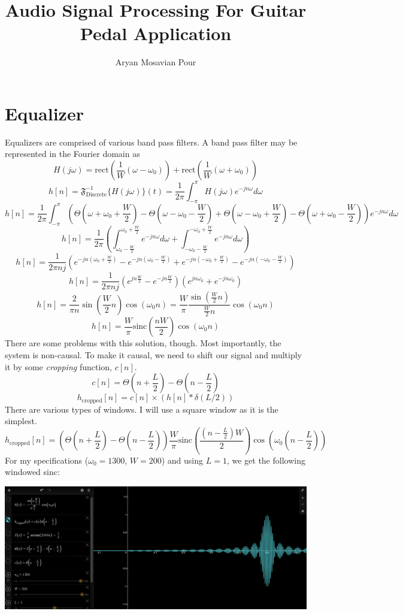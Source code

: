 \documentclass[a4paper]{article}
\title{Audio Signal Processing For Guitar Pedal Application}
\author{Aryan Mosavian Pour}
\begin{document}
\maketitle
\section{Equalizer}
Equalizers are comprised of various band pass filters. A band pass filter may be represented in the Fourier domain as
$$H(j\omega) = \text{rect}(\frac{1}{W}(\omega - \omega_0)) + \text{rect}(\frac{1}{W}(\omega + \omega_0))$$
$$h[n] = \mathfrak{F}^{-1}_\text{Discrete}\{H(j\omega)\}(t) = \frac{1}{2\pi}\int_{-\pi}^\pi H(j\omega) e^{-jn\omega}d\omega$$
$$h[n] = \frac{1}{2\pi}\int_{-\pi}^\pi (\Theta(\omega + \omega_0 + \frac{W}{2})-\Theta(\omega - \omega_0 - \frac{W}{2}) + \Theta(\omega - \omega_0 + \frac{W}{2})-\Theta(\omega + \omega_0 - \frac{W}{2}))e^{-jn\omega}d\omega$$
$$h[n] = \frac{1}{2\pi}(\int_{\omega_0 - \frac{W}{2}}^{\omega_0 + \frac{W}{2}} e^{-jn\omega}d\omega + \int_{-\omega_0 - \frac{W}{2}}^{-\omega_0 + \frac{W}{2}} e^{-jn\omega}d\omega)$$
$$h[n] = \frac{1}{2\pi nj}(e^{-jn(\omega_0 + \frac{W}{2})} - e^{-jn(\omega_0 - \frac{W}{2})} + e^{-jn(-\omega_0 + \frac{W}{2})} - e^{-jn(-\omega_0 - \frac{W}{2})})$$
$$h[n] = \frac{1}{2\pi nj}(e^{jn\frac{W}{2}} - e^{-jn\frac{W}{2}})(e^{jn\omega_0} + e^{-jn\omega_0})$$
$$h[n] = \frac{2}{\pi n}\sin(\frac{W}{2} n)\cos(\omega_0 n) = \frac{W}{\pi} \frac{\sin(\frac{W}{2}n)}{\frac{W}{2}n}\cos(\omega_0 n)$$
$$h[n] = \frac{W}{\pi} \text{sinc}(\frac{nW}{2})\cos(\omega_0 n)$$
There are some problems with this solution, though. Most importantly, the system is non-causal. To make it causal, we need to shift our signal and multiply it by some \textit{cropping} function, $c[n]$. 
$$c[n] = \Theta(n + \frac{L}{2}) - \Theta(n - \frac{L}{2})$$
$$h_\text{cropped}[n] = c[n] \times (h[n] * \delta(L/2))$$
There are various types of windows. I will use a square window as it is the simplest.
$$h_\text{cropped}[n] = (\Theta(n + \frac{L}{2}) - \Theta(n - \frac{L}{2})) \frac{W}{\pi} \text{sinc}(\frac{(n-\frac{L}{2})W}{2})\cos(\omega_0 (n-\frac{L}{2}))$$
For my specifications ($\omega_0 = 1300$, $W = 200$) and using $L = 1$, we get the following windowed sinc:
\begin{center}
\includegraphics[scale=0.3]{cropped_sinc.png} 
\end{center}
\end{document}
